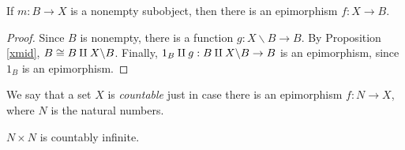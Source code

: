 




\begin{prop} If $m:B\to X$ is a nonempty subobject, then there is an
  epimorphism $f:X\to B$.  \label{retraction} \end{prop}

\begin{proof} Since $B$ is nonempty, there is a function
  $g:X\backslash B\to B$.  By Proposition \ref{xmid}, $B\cong B\amalg
  X\backslash B$.  Finally, $1_B\amalg g:B\amalg X\backslash B\to B$ is an
  epimorphism, since $1_B$ is an epimorphism. \end{proof}






\begin{defn} We say that a set $X$ is \emph{countable} just in case
  there is an epimorphism $f:N\to X$, where $N$ is the natural
  numbers. \end{defn}

\begin{prop} $N\times N$ is countably infinite. \end{prop}

